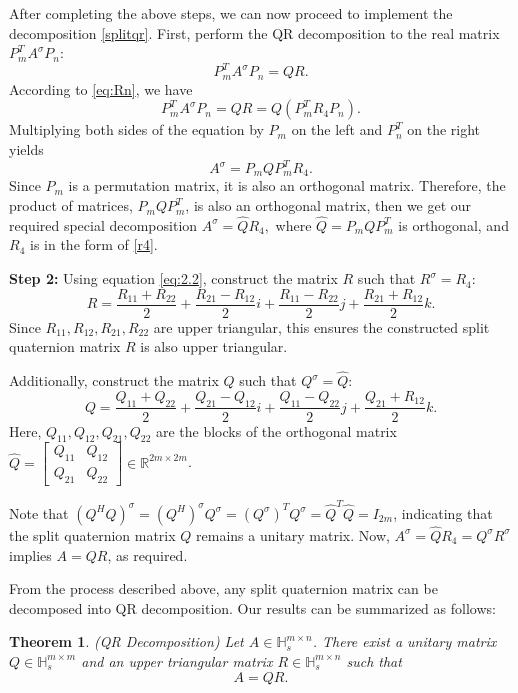 \documentclass[preprint,12pt]{elsarticle}
\newtheorem{theorem}{Theorem}[section]
\numberwithin{equation}{section}
\begin{document}
After completing the above steps, we can now proceed to implement the decomposition \eqref{splitqr}.
First, perform the QR decomposition to the real matrix $P_m^TA^\sigma P_{n}$:
\[P_m^TA^\sigma P_n = QR.\]
According to \eqref{eq:Rn}, we have
\[P_m^TA^\sigma P_n = QR = Q(P_m^TR_4P_n).\]
Multiplying both sides of the equation by $P_m$ on the left and $P_n^T$ on the right yields
\[A^\sigma=P_mQP_m^T R_4.\]
Since $P_m$ is a permutation matrix, it is also an orthogonal matrix. Therefore, the product of matrices, $P_mQP_m^T$, is also an orthogonal matrix, then we get our required special decomposition $A^\sigma=\hat{Q}R_4,$ where $\hat{Q}=P_mQP_m^T$ is orthogonal, and $R_4$ is in the form of \eqref{r4}.


\textbf{Step 2:} Using equation \eqref{eq:2.2}, construct the matrix $R$ such that $R^\sigma=R_4:$
$$
R = \frac{R_{11} + R_{22}}{2} + \frac{R_{21} - R_{12}}{2}i + \frac{R_{11} - R_{22}}{2}j + \frac{R_{21} + R_{12}}{2}k.
$$
Since $R_{11}, R_{12}, R_{21}, R_{22}$ are upper triangular, this ensures the constructed split quaternion matrix $R$ is also upper triangular.


Additionally, construct the matrix $Q$ such that $Q^\sigma=\hat{Q}:$
$$
Q = \frac{Q_{11} + Q_{22}}{2} + \frac{Q_{21} - Q_{12}}{2}i + \frac{Q_{11} - Q_{22}}{2}j + \frac{Q_{21} + R_{12}}{2}k.
$$
Here,  $Q_{11}, 
 Q_{12}, Q_{21}, Q_{22}$ are the blocks of the orthogonal matrix $\hat{Q} = \begin{bmatrix} Q_{11} & Q_{12} \\ Q_{21} & Q_{22} \end{bmatrix} \in \mathbb{
 R}^{2m \times 2m}$.

Note that $(Q^H Q)^\sigma = {(Q^H)}^\sigma Q^\sigma = {(Q^\sigma)}^TQ^\sigma = \hat{Q}^T\hat{Q} = I_{2m}$, indicating that the split quaternion matrix $Q$ remains a unitary matrix.
Now, $A^\sigma=\hat{Q}R_4=Q^\sigma R^\sigma$ implies
$A = Q R$, as required.

From the process described above,  any split quaternion matrix can be decomposed into QR decomposition. Our results can be summarized as follows:
\begin{theorem}(QR Decomposition)
    Let $A \in \mathbb{H}_s^{m \times n}$. There exist a unitary matrix $Q \in \mathbb{H}_s^{m \times m}$ and an upper triangular matrix $R \in \mathbb{H}_s^{m \times n}$ such that
    \begin{equation}
        A = Q R.\label{eq:split QR}
    \end{equation}
\end{theorem}
\end{document}
